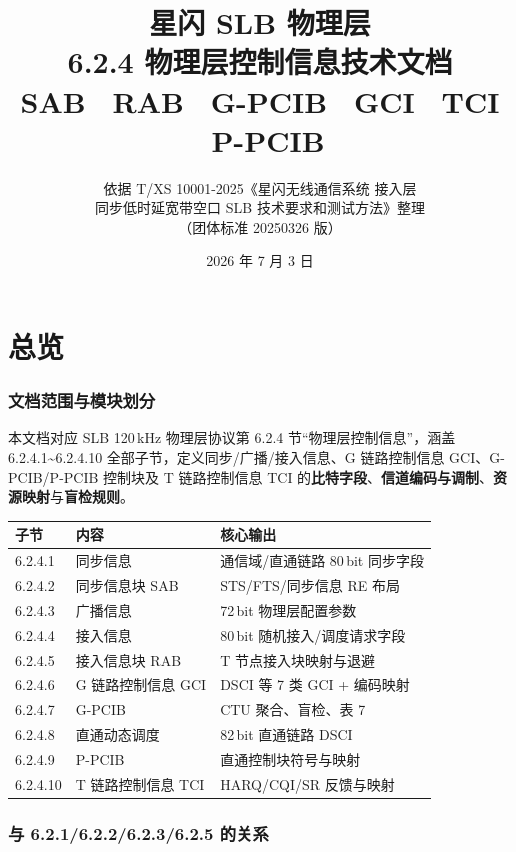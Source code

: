 \documentclass[11pt,a4paper]{ctexart}
\title{%
  \textbf{星闪 SLB 物理层}\\[0.4em]
  \Large 6.2.4 物理层控制信息技术文档\\[0.3em]
  \large SAB \textbullet\ RAB \textbullet\ G-PCIB \textbullet\ GCI \textbullet\ TCI \textbullet\ P-PCIB
}
\author{依据 T/XS 10001-2025《星闪无线通信系统 接入层\\
同步低时延宽带空口 SLB 技术要求和测试方法》整理\\
（团体标准 20250326 版）}
\date{2026 年 7 月 3 日}
\begin{document}
\maketitle
\tableofcontents
\newpage

\part{总览}

\section{文档范围与模块划分}

本文档对应 SLB 120\,kHz 物理层协议第 6.2.4 节``物理层控制信息''，涵盖 6.2.4.1\textasciitilde 6.2.4.10 全部子节，定义同步/广播/接入信息、G 链路控制信息 GCI、G-PCIB/P-PCIB 控制块及 T 链路控制信息 TCI 的\textbf{比特字段}、\textbf{信道编码与调制}、\textbf{资源映射}与\textbf{盲检规则}。

\begin{table}[h]
\centering
\small
\begin{tabular}{lll}
\toprule
\textbf{子节} & \textbf{内容} & \textbf{核心输出} \\
\midrule
6.2.4.1 & 同步信息 & 通信域/直通链路 80\,bit 同步字段 \\
6.2.4.2 & 同步信息块 SAB & STS/FTS/同步信息 RE 布局 \\
6.2.4.3 & 广播信息 & 72\,bit 物理层配置参数 \\
6.2.4.4 & 接入信息 & 80\,bit 随机接入/调度请求字段 \\
6.2.4.5 & 接入信息块 RAB & T 节点接入块映射与退避 \\
6.2.4.6 & G 链路控制信息 GCI & DSCI 等 7 类 GCI + 编码映射 \\
6.2.4.7 & G-PCIB & CTU 聚合、盲检、表 7 \\
6.2.4.8 & 直通动态调度 & 82\,bit 直通链路 DSCI \\
6.2.4.9 & P-PCIB & 直通控制块符号与映射 \\
6.2.4.10 & T 链路控制信息 TCI & HARQ/CQI/SR 反馈与映射 \\
\bottomrule
\end{tabular}
\end{table}

\section{与 6.2.1/6.2.2/6.2.3/6.2.5 的关系}
\end{document}
